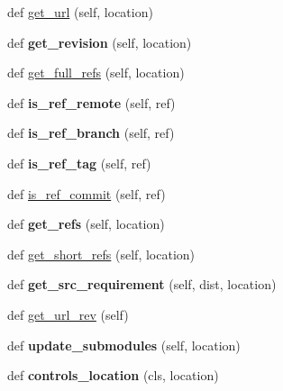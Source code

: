 \begin{DoxyCompactItemize}
\item 
def \hyperlink{classpip_1_1vcs_1_1git_1_1_git_afc57b1e93b7e9446f4b0f5bde3d70be4}{get\+\_\+url} (self, location)
\item 
\mbox{\label{classpip_1_1vcs_1_1git_1_1_git_a02b02c0cf190078182b57d7c5c1a7c7c}} 
def {\bfseries get\+\_\+revision} (self, location)
\item 
def \hyperlink{classpip_1_1vcs_1_1git_1_1_git_a047000fdc1194f32005744dff5ac929d}{get\+\_\+full\+\_\+refs} (self, location)
\item 
\mbox{\label{classpip_1_1vcs_1_1git_1_1_git_afc373f792a7f4f6029298aade14a374c}} 
def {\bfseries is\+\_\+ref\+\_\+remote} (self, ref)
\item 
\mbox{\label{classpip_1_1vcs_1_1git_1_1_git_a83bc947cef0a4da006a076189d47930b}} 
def {\bfseries is\+\_\+ref\+\_\+branch} (self, ref)
\item 
\mbox{\label{classpip_1_1vcs_1_1git_1_1_git_aa93078b2632f969cd2df3dec2b31ac41}} 
def {\bfseries is\+\_\+ref\+\_\+tag} (self, ref)
\item 
def \hyperlink{classpip_1_1vcs_1_1git_1_1_git_a608b7df61ed6b95a42e6989777e981ca}{is\+\_\+ref\+\_\+commit} (self, ref)
\item 
\mbox{\label{classpip_1_1vcs_1_1git_1_1_git_a785801c2b23742bf9a5fe6d2c25be6eb}} 
def {\bfseries get\+\_\+refs} (self, location)
\item 
def \hyperlink{classpip_1_1vcs_1_1git_1_1_git_a31f34b094034c842af0dcf29a43826cd}{get\+\_\+short\+\_\+refs} (self, location)
\item 
\mbox{\label{classpip_1_1vcs_1_1git_1_1_git_a79e2a54753fdff90e0bad7f53d6cb1af}} 
def {\bfseries get\+\_\+src\+\_\+requirement} (self, dist, location)
\item 
def \hyperlink{classpip_1_1vcs_1_1git_1_1_git_a4bef8c67067f75d14376fb2208b1076d}{get\+\_\+url\+\_\+rev} (self)
\item 
\mbox{\label{classpip_1_1vcs_1_1git_1_1_git_a2bdda103e6260261f57929bbec5ea967}} 
def {\bfseries update\+\_\+submodules} (self, location)
\item 
\mbox{\label{classpip_1_1vcs_1_1git_1_1_git_a9d82be6394269502943843c25462fcb3}} 
def {\bfseries controls\+\_\+location} (cls, location)
\end{DoxyCompactItemize}
